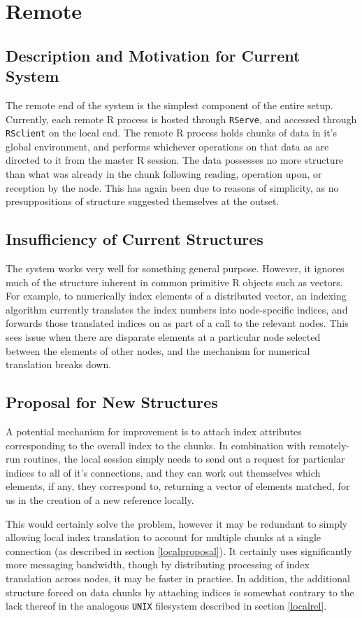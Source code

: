 \documentclass[a4paper]{article}
\begin{document}
\section{Remote}
\subsection{Description and Motivation for Current System}
The remote end of the system is the simplest component of the entire setup.
Currently, each remote R process is hosted through \texttt{RServe}, and
accessed through \texttt{RSclient} on the local end.
The remote R process holds chunks of data in it's global environment, and
performs whichever operations on that data as are directed to it from the
master R session.
The data possesses no more structure than what was already in the chunk
following reading, operation upon, or reception by the node.
This has again been due to reasons of simplicity, as no presuppositions of
structure suggested themselves at the outset.

\subsection{Insufficiency of Current Structures}
The system works very well for something general purpose.
However, it ignores much of the structure inherent in common primitive R
objects such as vectors.
For example, to numerically index elements of a distributed vector, an indexing
algorithm currently translates the index numbers into node-specific indices,
and forwards those translated indices on as part of a call to the relevant
nodes. 
This sees issue when there are disparate elements at a particular node selected
between the elements of other nodes, and the mechanism for numerical
translation breaks down.

\subsection{Proposal for New Structures}
A potential mechanism for improvement is to attach index attributes
corresponding to the overall index to the chunks.
In combination with remotely-run routines, the local session simply needs to
send out a request for particular indices to all of it's connections, and they
can work out themselves which elements, if any, they correspond to, returning a
vector of elements matched, for us in the creation of a new reference locally.

This would certainly solve the problem, however it may be redundant to simply
allowing local index translation to account for multiple chunks at a single
connection (as described in section \ref{localproposal}).
It certainly uses significantly more messaging bandwidth, though by
distributing processing of index translation across nodes, it may be faster in
practice.
In addition, the additional structure forced on data chunks by attaching
indices is somewhat contrary to the lack thereof in the analogous \texttt{UNIX}
filesystem described in section \ref{localrel}.
\end{document}

